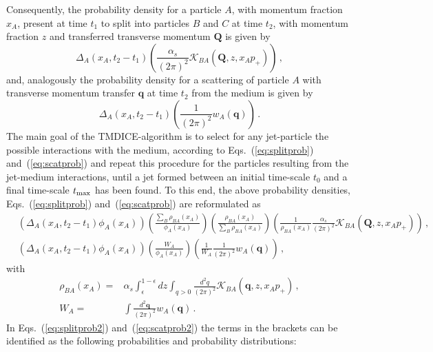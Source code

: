 \documentclass[preprint,12pt]{elsarticle}
\newcommand{\tmdice}{{\sf TMDICE}}
\begin{document}
Consequently, the probability density for a particle $A$, with momentum fraction $x_A$, present at time $t_1$ to split into particles $B$ and $C$ at time $t_2$, with momentum fraction $z$ and transferred transverse momentum $\mathbf{Q}$ is given by
%
\begin{equation}
    \Delta_A(x_A,t_2-t_1)\left( \frac{\alpha_s}{(2\pi)^2}\mathcal{K}_{BA}(\mathbf{Q},z,x_Ap_+)\right)\,,
    \label{eq:splitprob}
\end{equation}
%
and, analogously the probability density for a scattering of particle $A$ with transverse momentum transfer $\mathbf{q}$ at time $t_2$ from the medium is given by 
\begin{equation}
    \Delta_A(x_A,t_2-t_1)\left( \frac{1}{(2\pi)^2}w_A(\mathbf{q})\right)\,.
    \label{eq:scatprob}
\end{equation}
The main goal of the \tmdice-algorithm is to select for any jet-particle the possible interactions with the medium, according to Eqs.~(\ref{eq:splitprob}) and~(\ref{eq:scatprob}) and repeat this procedure for the particles resulting from the jet-medium interactions, until a jet formed between an initial time-scale $t_0$ and a final time-scale $t_{\rm max}$ has been found.
To this end, the above probability densities, Eqs.~(\ref{eq:splitprob}) and~(\ref{eq:scatprob}) are reformulated as
%
\begin{align}
   &
    \left(\Delta_A(x_A,t_2-t_1)
    \phi_A(x_A)\right)
    \left(
    \frac{\sum_B \rho_{BA}(x_A)}{\phi_A(x_A)}
    \right)
    \left(
    \frac{\rho_{BA}(x_A)}{\sum_B \rho_{BA}(x_A)}
    \right)
    \left(
    \frac{1}{\rho_{BA}(x_A)}
     \frac{\alpha_s}{(2\pi)^2}\mathcal{K}_{BA}(\mathbf{Q},z,x_Ap_+)\right)\,,
     \label{eq:splitprob2}
     \\
       &
    \left(\Delta_A(x_A,t_2-t_1)
    \phi_A(x_A)\right)
    \left(
    \frac{W_A}{\phi_A(x_A)}
    \right)
    \left(
    \frac{1}{W_A}
     \frac{1}{(2\pi)^2}w_A(\mathbf{q})\right)\,,
     \label{eq:scatprob2}
\end{align}
%
with
\begin{align}
    \rho_{BA}(x_A)=&\alpha_s\int_\epsilon^{1-\epsilon} dz\int_{q>0}\frac{d^2q}{(2\pi)^2}\mathcal{K}_{BA}(\mathbf{q},z,x_Ap_+)\,,\\
    W_A=&\int\frac{d^2\mathbf{q}}{(2\pi)^2}w_A(\mathbf{q})\,.
\end{align}
%
In Eqs.~(\ref{eq:splitprob2}) and~(\ref{eq:scatprob2}) the terms in the brackets can be identified as the following probabilities and probability distributions:
%
\end{document}
